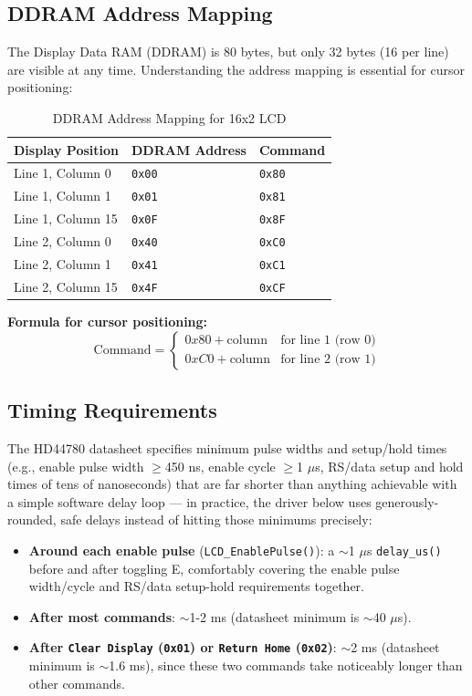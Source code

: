 \subsection{DDRAM Address Mapping}
\label{sec:ddram-mapping}

The Display Data RAM (DDRAM) is 80 bytes, but only 32 bytes (16 per line) are visible at any time. Understanding the address mapping is essential for cursor positioning:

\begin{table}[H]
\centering
\small
\renewcommand{\arraystretch}{1.2}
\begin{tabular}{lll}
\toprule
\textbf{Display Position} & \textbf{DDRAM Address} & \textbf{Command} \\
\midrule
Line 1, Column 0 & \texttt{0x00} & \texttt{0x80} \\
Line 1, Column 1 & \texttt{0x01} & \texttt{0x81} \\
Line 1, Column 15 & \texttt{0x0F} & \texttt{0x8F} \\
\midrule
Line 2, Column 0 & \texttt{0x40} & \texttt{0xC0} \\
Line 2, Column 1 & \texttt{0x41} & \texttt{0xC1} \\
Line 2, Column 15 & \texttt{0x4F} & \texttt{0xCF} \\
\bottomrule
\end{tabular}
\caption{DDRAM Address Mapping for 16x2 LCD}
\end{table}

\noindent
\textbf{Formula for cursor positioning:}
\[
\text{Command} = \begin{cases}
0x80 + \text{column} & \text{for line 1 (row 0)} \\
0xC0 + \text{column} & \text{for line 2 (row 1)}
\end{cases}
\]

\subsection{Timing Requirements}

The HD44780 datasheet specifies minimum pulse widths and setup/hold times (e.g., enable pulse width $\geq$450 ns, enable cycle $\geq$1 $\mu$s, RS/data setup and hold times of tens of nanoseconds) that are far shorter than anything achievable with a simple software delay loop — in practice, the driver below uses generously-rounded, safe delays instead of hitting those minimums precisely:

\begin{itemize}[nosep]
  \item \textbf{Around each enable pulse} (\texttt{LCD\_EnablePulse()}): a $\sim$1 $\mu$s \texttt{delay\_us()} before and after toggling E, comfortably covering the enable pulse width/cycle and RS/data setup-hold requirements together.
  \item \textbf{After most commands}: $\sim$1-2 ms (datasheet minimum is $\sim$40 $\mu$s).
  \item \textbf{After \texttt{Clear Display} (\texttt{0x01}) or \texttt{Return Home} (\texttt{0x02})}: $\sim$2 ms (datasheet minimum is $\sim$1.6 ms), since these two commands take noticeably longer than other commands.
\end{itemize}

